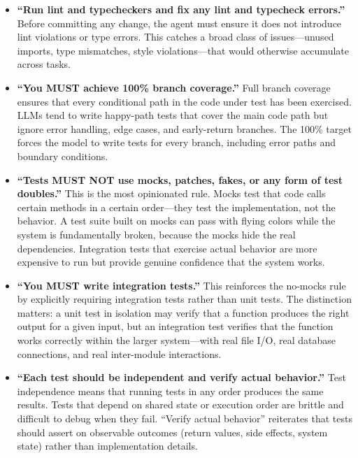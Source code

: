 \documentclass{article}
\begin{document}
\begin{itemize}[nosep]
\item \textbf{``Run lint and typecheckers and fix any lint and
  typecheck errors.''}  Before committing any change, the agent must
  ensure it does not introduce lint violations or type errors.  This
  catches a broad class of issues---unused imports, type mismatches,
  style violations---that would otherwise accumulate across tasks.

\item \textbf{``You MUST achieve 100\% branch coverage.''}  Full
  branch coverage ensures that every conditional path in the code
  under test has been exercised.  LLMs tend to write happy-path tests
  that cover the main code path but ignore error handling, edge cases,
  and early-return branches.  The 100\% target forces the model to
  write tests for every branch, including error paths and boundary
  conditions.

\item \textbf{``Tests MUST NOT use mocks, patches, fakes, or any form
  of test doubles.''}  This is the most opinionated rule.  Mocks test
  that code calls certain methods in a certain order---they test the
  implementation, not the behavior.  A test suite built on mocks can
  pass with flying colors while the system is fundamentally broken,
  because the mocks hide the real dependencies.  Integration tests
  that exercise actual behavior are more expensive to run but provide
  genuine confidence that the system works.

\item \textbf{``You MUST write integration tests.''}  This reinforces
  the no-mocks rule by explicitly requiring integration tests rather
  than unit tests.  The distinction matters: a unit test in isolation
  may verify that a function produces the right output for a given
  input, but an integration test verifies that the function works
  correctly within the larger system---with real file I/O, real
  database connections, and real inter-module interactions.

\item \textbf{``Each test should be independent and verify actual
  behavior.''}  Test independence means that running tests in any
  order produces the same results.  Tests that depend on shared state
  or execution order are brittle and difficult to debug when they
  fail.  ``Verify actual behavior'' reiterates that tests should
  assert on observable outcomes (return values, side effects, system
  state) rather than implementation details.


\end{itemize}
\end{document}
